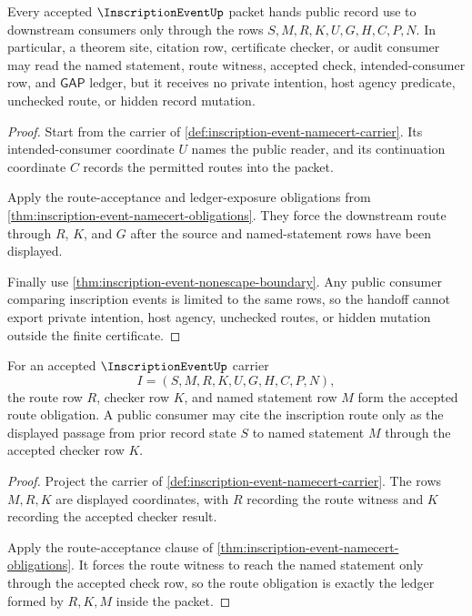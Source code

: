 \begin{theorem}
\label{thm:inscription-event-downstream-handoff}
Every accepted $\InscriptionEventUp$ packet hands public record use to downstream consumers only through the rows $S,M,R,K,U,G,H,C,P,N$. In particular, a theorem site, citation row, certificate checker, or audit consumer may read the named statement, route witness, accepted check, intended-consumer row, and $\mathsf{GAP}$ ledger, but it receives no private intention, host agency predicate, unchecked route, or hidden record mutation.
\end{theorem}
\begin{proof}
Start from the carrier of \autoref{def:inscription-event-namecert-carrier}. Its intended-consumer coordinate $U$ names the public reader, and its continuation coordinate $C$ records the permitted routes into the packet.

Apply the route-acceptance and ledger-exposure obligations from \autoref{thm:inscription-event-namecert-obligations}. They force the downstream route through $R$, $K$, and $G$ after the source and named-statement rows have been displayed.

Finally use \autoref{thm:inscription-event-nonescape-boundary}. Any public consumer comparing inscription events is limited to the same rows, so the handoff cannot export private intention, host agency, unchecked routes, or hidden mutation outside the finite certificate.
\end{proof}

\begin{theorem}
\label{thm:inscription-event-obligation-route-ledger}
For an accepted $\InscriptionEventUp$ carrier
$$
I=(S,M,R,K,U,G,H,C,P,N),
$$
the route row $R$, checker row $K$, and named statement row $M$ form the accepted route obligation. A public consumer may cite the inscription route only as the displayed passage from prior record state $S$ to named statement $M$ through the accepted checker row $K$.
\end{theorem}
\begin{proof}
Project the carrier of \autoref{def:inscription-event-namecert-carrier}. The rows $M,R,K$ are displayed coordinates, with $R$ recording the route witness and $K$ recording the accepted checker result.

Apply the route-acceptance clause of \autoref{thm:inscription-event-namecert-obligations}. It forces the route witness to reach the named statement only through the accepted check row, so the route obligation is exactly the ledger formed by $R,K,M$ inside the packet.
\end{proof}

